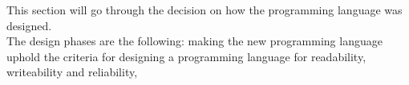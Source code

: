   This section will go through the decision on how the programming language was designed.
 \\
 The design phases are the following: making the new programming language uphold the criteria for designing a programming language for readability, writeability and reliability, 
 